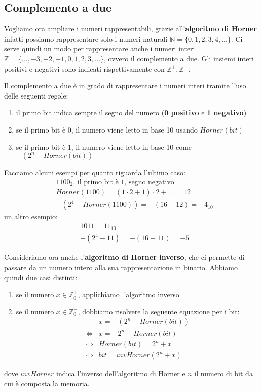 \documentclass[../main.tex]{subfiles}
\begin{document}
\pagebreak
\subsection{Complemento a due}
Vogliamo ora ampliare i numeri rappresentabili, grazie all'\textbf{algoritmo di Horner} infatti possiamo rappresentare solo i numeri
naturali $\mathbb{N} = \{ 0, 1, 2, 3, 4, ... \} $. Ci serve quindi un modo per rappresentare anche i numeri interi
$\mathbb{Z} = \{ ..., -3, -2, -1, 0, 1, 2, 3, ... \} $, ovvero il complemento a due. Gli insiemi interi positivi e negativi sono indicati
rispettivamente con $\mathbb{Z^+}, \mathbb{Z^-}$.

Il complemento a due è in grado di rappresentare i numeri interi tramite l'uso delle seguenti regole:
\begin{enumerate}
    \item il primo bit indica sempre il segno del numero (\textbf{0 positivo} e \textbf{1 negativo})
    \item se il primo bit è 0, il numero viene letto in base 10 usando $Horner(bit)$
    \item se il primo bit è 1, il numero viene letto in base 10 come $-(2^n - Horner(bit))$
\end{enumerate}

Facciamo alcuni esempi per quanto riguarda l'ultimo caso:
\begin{align*}
    &1100_2 \text{, il primo bit è 1, segno negativo}\\
    &Horner(1100) = (1 \cdot 2 + 1)\cdot 2 + ... = 12 \\
    &-(2^4 - Horner(1100)) = -(16-12) = -4_{10}
\end{align*}
un altro esempio:
\begin{align*}
    &1011 = 11_{10}\\
    &-(2^4 - 11) = -(16-11) = -5
\end{align*}

Consideriamo ora anche l'\textbf{algoritmo di Horner inverso}, che ci permette di passare da un numero intero alla sua rappresentazione
in binario. Abbiamo quindi due casi distinti:
\begin{enumerate}
    \item se il numero $x \in \mathbb{Z}_0^+$, applichiamo l'algoritmo inverso
    \item se il numero $x \in \mathbb{Z}_0^-$, dobbiamo risolvere la seguente equazione per i \underline{bit}: \begin{align*}
        &x = -(2^n - Horner(bit)) \\
        \Longleftrightarrow &x = -2^n + Horner(bit) \\
        \Longleftrightarrow &Horner(bit) = 2^n + x \\
        \Longleftrightarrow &bit = invHorner(2^n+x)
    \end{align*}
\end{enumerate}
dove $invHorner$ indica l'inverso dell'algoritmo di Horner e $n$ il numero di bit da cui è composta la memoria.
\end{document}
